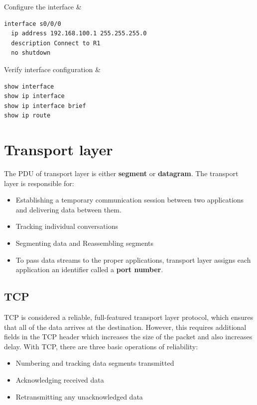 {Configure the interface & 
\begin{minipage}{3in}
\begin{verbatim}
interface s0/0/0
  ip address 192.168.100.1 255.255.255.0
  description Connect to R1
  no shutdown
\end{verbatim}
\end{minipage}\w

Verify interface configuration & 
\begin{minipage}{3in}
\begin{verbatim}
show interface
show ip interface
show ip interface brief
show ip route
\end{verbatim}
\end{minipage}\w

\tableEnd

\section{Transport layer}

The PDU of transport layer is either \textbf{segment} or \textbf{datagram}. The transport layer is responsible for:

\begin{itemize}
\item Establishing a temporary communication session between two applications and delivering data between them. 
\item Tracking individual conversations
\item Segmenting data and Reassembling segments
\item To pass data streams to the proper applications, transport layer assigns each application an identifier called a \textbf{port number}. 
\end{itemize}

\subsection{TCP}

TCP is considered a reliable, full-featured transport layer protocol, which ensures that all of the data arrives at the destination. However, this requires additional fields in the TCP header which increases the size of the packet and also increases delay. With TCP, there are three basic operations of reliability:

\begin{itemize}
\item Numbering and tracking data segments transmitted 
\item Acknowledging received data
\item Retransmitting any unacknowledged data 
\end{itemize}

}
